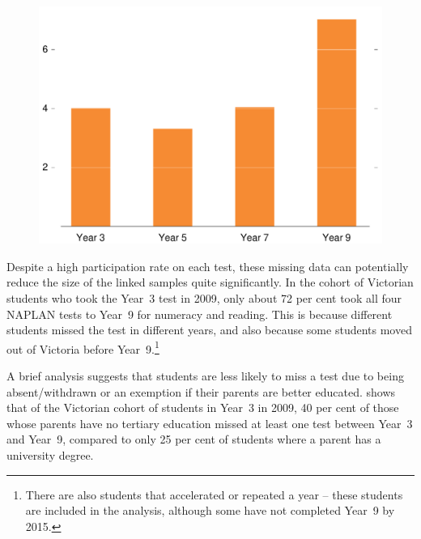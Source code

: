 \begin{figure}[t]
 \includegraphics[width=\columnwidth]{atlas/Absent_pc.pdf}\label{fig:absent_pc}

\end{figure}

Despite a high participation rate on each test, these missing data can potentially reduce the size of the linked samples quite significantly. In the cohort of Victorian students who took the \mbox{Year 3} test in 2009, only about 72 per cent took all four NAPLAN tests to \mbox{Year 9} for numeracy and reading. This is because different students missed the test in different years, and also because some students moved out of Victoria before \mbox{Year 9}.\footnote{There are also students that accelerated or repeated a year -- these students are included in the analysis, although some have not completed \mbox{Year 9} by 2015.}

A brief analysis suggests that students are less likely to miss a test due to being absent/withdrawn or an exemption if their parents are better educated.  shows that of the Victorian cohort of students in \mbox{Year 3} in 2009, 40 per cent of those whose parents have no tertiary education missed at least one test between \mbox{Year 3} and \mbox{Year 9}, compared to only 25 per cent of students where a parent has a university degree.

